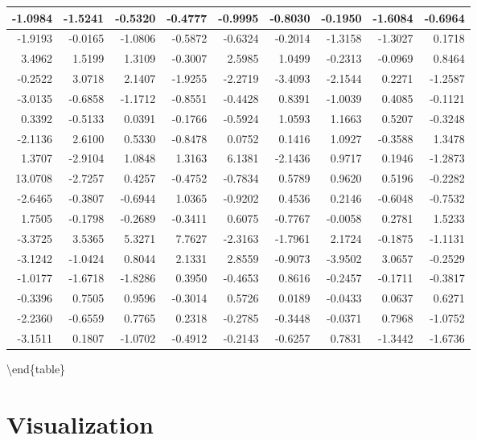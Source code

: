 \documentclass[
  letterpaper,
  DIV=11,
  numbers=noendperiod]{scrreprt}
\begin{document}
\begin{tabular}[t]{r|r|r|r|r|r|r|r|r}
\hline
-1.0984 & -1.5241 & -0.5320 & -0.4777 & -0.9995 & -0.8030 & -0.1950 & -1.6084 & -0.6964\\
\hline
-1.9193 & -0.0165 & -1.0806 & -0.5872 & -0.6324 & -0.2014 & -1.3158 & -1.3027 & 0.1718\\
\hline
3.4962 & 1.5199 & 1.3109 & -0.3007 & 2.5985 & 1.0499 & -0.2313 & -0.0969 & 0.8464\\
\hline
-0.2522 & 3.0718 & 2.1407 & -1.9255 & -2.2719 & -3.4093 & -2.1544 & 0.2271 & -1.2587\\
\hline
-3.0135 & -0.6858 & -1.1712 & -0.8551 & -0.4428 & 0.8391 & -1.0039 & 0.4085 & -0.1121\\
\hline
0.3392 & -0.5133 & 0.0391 & -0.1766 & -0.5924 & 1.0593 & 1.1663 & 0.5207 & -0.3248\\
\hline
-2.1136 & 2.6100 & 0.5330 & -0.8478 & 0.0752 & 0.1416 & 1.0927 & -0.3588 & 1.3478\\
\hline
1.3707 & -2.9104 & 1.0848 & 1.3163 & 6.1381 & -2.1436 & 0.9717 & 0.1946 & -1.2873\\
\hline
13.0708 & -2.7257 & 0.4257 & -0.4752 & -0.7834 & 0.5789 & 0.9620 & 0.5196 & -0.2282\\
\hline
-2.6465 & -0.3807 & -0.6944 & 1.0365 & -0.9202 & 0.4536 & 0.2146 & -0.6048 & -0.7532\\
\hline
1.7505 & -0.1798 & -0.2689 & -0.3411 & 0.6075 & -0.7767 & -0.0058 & 0.2781 & 1.5233\\
\hline
-3.3725 & 3.5365 & 5.3271 & 7.7627 & -2.3163 & -1.7961 & 2.1724 & -0.1875 & -1.1131\\
\hline
-3.1242 & -1.0424 & 0.8044 & 2.1331 & 2.8559 & -0.9073 & -3.9502 & 3.0657 & -0.2529\\
\hline
-1.0177 & -1.6718 & -1.8286 & 0.3950 & -0.4653 & 0.8616 & -0.2457 & -0.1711 & -0.3817\\
\hline
-0.3396 & 0.7505 & 0.9596 & -0.3014 & 0.5726 & 0.0189 & -0.0433 & 0.0637 & 0.6271\\
\hline
-2.2360 & -0.6559 & 0.7765 & 0.2318 & -0.2785 & -0.3448 & -0.0371 & 0.7968 & -1.0752\\
\hline
-3.1511 & 0.1807 & -1.0702 & -0.4912 & -0.2143 & -0.6257 & 0.7831 & -1.3442 & -1.6736\\
\hline
\end{tabular}

\textbackslash end\{table\}

\hypertarget{visualization-1}{%
\section{Visualization}\label{visualization-1}}
\end{document}

